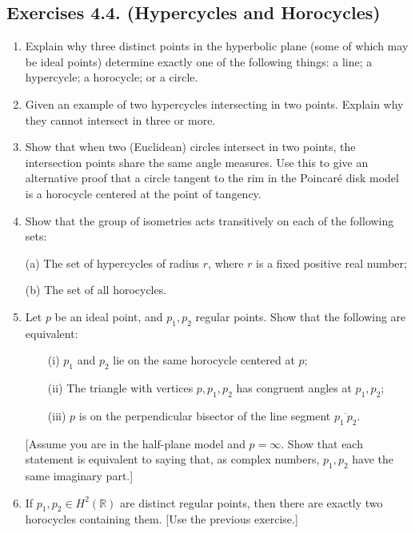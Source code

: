 \documentclass[leqno]{book}
\begin{document}
\subsection*{Exercises 4.4. (Hypercycles and Horocycles)} %
\begin{enumerate}
\item Explain why three distinct points in the hyperbolic plane (some of which may be ideal points) determine exactly one of the following things: a line; a hypercycle; a horocycle; or a circle.

\item Given an example of two hypercycles intersecting in two points.  Explain why they cannot intersect in three or more.

\item Show that when two (Euclidean) circles intersect in two points, the intersection points share the same angle measures.  Use this to give an alternative proof that a circle tangent to the rim in the Poincar\'e disk model is a horocycle centered at the point of tangency.

\item Show that the group of isometries acts transitively on each of the following sets:

(a) The set of hypercycles of radius $r$, where $r$ is a fixed positive real number;

(b) The set of all horocycles.

\item Let $p$ be an ideal point, and $p_1,p_2$ regular points.  Show that the following are equivalent:

~~~~(i) $p_1$ and $p_2$ lie on the same horocycle centered at $p$;

~~~~(ii) The triangle with vertices $p,p_1,p_2$ has congruent angles at $p_1,p_2$;

~~~~(iii) $p$ is on the perpendicular bisector of the line segment $\overline{p_1~p_2}$.

[Assume you are in the half-plane model and $p=\infty$.  Show that each statement is equivalent to saying that, as complex numbers, $p_1,p_2$ have the same imaginary part.]

\item If $p_1,p_2\in H^2(\mathbb R)$ are distinct regular points, then there are exactly two horocycles containing them.  [Use the previous exercise.]


\end{enumerate}
\end{document}
